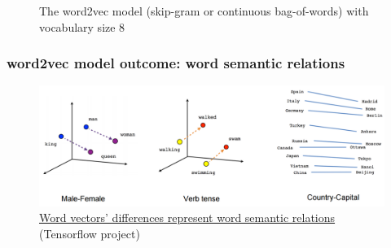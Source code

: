 \documentclass{article}
\begin{document}
\begin{landscape}
\begin{figure}[H]
	\caption{The word2vec model (skip-gram or continuous bag-of-words) with vocabulary size 8}
	\label{fig:skipGram}
\end{figure}
\subsubsection{word2vec model outcome: word semantic relations}
\begin{figure}[H]
	\centering
	\includegraphics[width=\linewidth]{linear-relationships}
	\caption{
		\href{https://www.tensorflow.org/tutorials/word2vec/}
		{Word vectors' differences represent word semantic relations} (Tensorflow project)
	}
	\label{fig:linear-relationships}
\end{figure}

\end{landscape}
\end{document}
